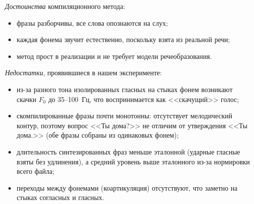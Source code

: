 \emph{Достоинства} компиляционного метода:
\begin{itemize}
	\item фразы разборчивы, все слова опознаются на слух;
	\item каждая фонема звучит естественно, поскольку взята из реальной
	речи;
	\item метод прост в реализации и не требует модели речеобразования.
\end{itemize}

\emph{Недостатки}, проявившиеся в нашем эксперименте:
\begin{itemize}
	\item из-за разного тона изолированных гласных на стыках фонем
	возникают скачки $F_0$ до 35--100~Гц, что воспринимается как
	<<скачущий>> голос;
	\item скомпилированные фразы почти монотонны: отсутствует мелодический
	контур, поэтому вопрос <<Ты дома?>> не отличим от утверждения
	<<Ты дома.>> (обе фразы собраны из одинаковых фонем);
	\item длительность синтезированных фраз меньше эталонной (ударные
	гласные взяты без удлинения), а средний уровень выше эталонного из-за
	нормировки всего файла;
	\item переходы между фонемами (коартикуляция) отсутствуют, что заметно
	на стыках согласных и гласных.
\end{itemize}

